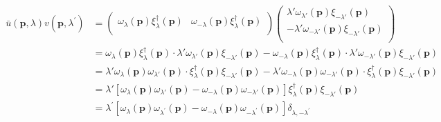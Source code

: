 \begin{equation}
    \begin{aligned}
        \begin{aligned}
            \bar{u}\left( \mathbf{p},\lambda \right) v\left( \mathbf{p},\lambda ^{\prime} \right) &=\left( \begin{matrix}
	\omega _{\lambda}\left( \mathbf{p} \right) \xi _{\lambda}^{\dagger}\left( \mathbf{p} \right)&		\omega _{-\lambda}\left( \mathbf{p} \right) \xi _{\lambda}^{\dagger}\left( \mathbf{p} \right)\\
\end{matrix} \right) \left( \begin{array}{c}
	\lambda \prime \omega _{\lambda \prime}\left( \mathbf{p} \right) \xi _{-\lambda \prime}\left( \mathbf{p} \right)\\
	-\lambda \prime \omega _{-\lambda \prime}\left( \mathbf{p} \right) \xi _{-\lambda \prime}\left( \mathbf{p} \right)\\
\end{array} \right) 
\\
&=\omega _{\lambda}\left( \mathbf{p} \right) \xi _{\lambda}^{\dagger}\left( \mathbf{p} \right) \cdot \lambda \prime \omega _{\lambda \prime}\left( \mathbf{p} \right) \xi _{-\lambda \prime}\left( \mathbf{p} \right) -\omega _{-\lambda}\left( \mathbf{p} \right) \xi _{\lambda}^{\dagger}\left( \mathbf{p} \right) \cdot \lambda \prime \omega _{-\lambda \prime}\left( \mathbf{p} \right) \xi _{-\lambda \prime}\left( \mathbf{p} \right) 
\\
&=\lambda \prime \omega _{\lambda}\left( \mathbf{p} \right) \omega _{\lambda \prime}\left( \mathbf{p} \right) \cdot \xi _{\lambda}^{\dagger}\left( \mathbf{p} \right) \xi _{-\lambda \prime}\left( \mathbf{p} \right) -\lambda \prime \omega _{-\lambda}\left( \mathbf{p} \right) \omega _{-\lambda \prime}\left( \mathbf{p} \right) \cdot \xi _{\lambda}^{\dagger}\left( \mathbf{p} \right) \xi _{-\lambda \prime}\left( \mathbf{p} \right) 
\\
&=\lambda \prime \left[ \omega _{\lambda}\left( \mathbf{p} \right) \omega _{\lambda \prime}\left( \mathbf{p} \right) -\omega _{-\lambda}\left( \mathbf{p} \right) \omega _{-\lambda \prime}\left( \mathbf{p} \right) \right] \xi _{\lambda}^{\dagger}\left( \mathbf{p} \right) \xi _{-\lambda \prime}\left( \mathbf{p} \right) 
\\
&=\lambda ^{\prime}\left[ \omega _{\lambda}\left( \mathbf{p} \right) \omega _{\lambda ^{\prime}}\left( \mathbf{p} \right) -\omega _{-\lambda}\left( \mathbf{p} \right) \omega _{-\lambda ^{\prime}}\left( \mathbf{p} \right) \right] \delta _{\lambda ,-\lambda ^{\prime}}

\end{aligned}
\end{aligned}
\end{equation}
